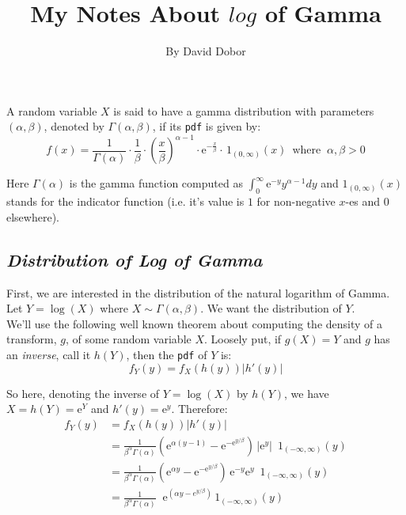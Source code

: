 \documentclass[12pt]{article}
\begin{document}
 \renewcommand{\arraystretch}{1.3}

 
\title{My Notes About $log$ of Gamma}%
\author{By David Dobor} %
\date{}
 
\maketitle

 A random variable $X$ is said to have a gamma distribution with parameters $(\alpha, \beta)$, denoted by  $\Gamma(\alpha, \beta)$, if its  \texttt{pdf} is given by:
$$
		f(x) = \frac{1}{\Gamma({\alpha})} \cdot \frac{1}{\beta} \cdot  \left( \frac{x}{\beta}\right)^{\alpha - 1} \cdot \mathrm{e}^{-\frac{x}{\beta}} \cdot\, 1_{(0,\infty)}(x) \,\,\, \text{where} \;\; \alpha, \beta > 0
$$

Here $\Gamma(\alpha)$ is the gamma function computed as $\int_0^{\infty} \mathrm{e}^{-y} y^{\alpha - 1} dy$ and $1_{(0,\infty)}(x)$ stands for the indicator function (i.e. it's value is $1$ for non-negative $x$-es and $0$ elsewhere). 


\bigskip


\begin{center}
\subsection*{\color{TealBlue}\emph{Distribution of Log of Gamma} }
\end{center}

First, we are interested in the distribution of the natural logarithm of Gamma. \\
Let $Y = \log (X)$ where  $X\sim\Gamma(\alpha,\beta)$.  We want the distribution of $Y$. \\

We'll use the following well known theorem about computing the density of a transform, $g$, of some random variable $X$. Loosely put, if $g(X) = Y$ and $g$ has an \emph{inverse}, call it $h(Y)$, then the \texttt{pdf} of $Y$ is:
$$
f_Y(y) = f_X(h(y)) |h'(y)|
$$

So here, denoting the inverse of $Y = \log (X)$ by $h(Y)$, we have $ X=h(Y)=\mathrm{e}^Y$ and $h'(y) = \mathrm{e}^{y}$. Therefore:
\begin{align*}
 f_Y(y) &= f_X(h(y)) |h'(y)| \\
 &= \frac{1}{\beta^\alpha \Gamma(\alpha)} \left(\mathrm{e}^{\alpha (y - 1)} - \mathrm{e}^{-\mathrm{e}^{y/\beta}}\right)\,|\mathrm{e}^{y}| \,\,\,1_{(-\infty,\infty)}(y) \\
  &= \frac{1}{\beta^\alpha \Gamma(\alpha)} \left(\mathrm{e}^{\alpha y} - \mathrm{e}^{-\mathrm{e}^{y/\beta}}\right)\,\mathrm{e}^{-y}\mathrm{e}^{y} \,\,\,1_{(-\infty,\infty)}(y) \\
 &= \frac{1}{\beta^\alpha \Gamma(\alpha)} \;\; \mathrm{e}^{\left(\alpha y - e^{y/\beta}\right)}\,1_{(-\infty,\infty)}(y) \\
\end{align*}
\end{document}
